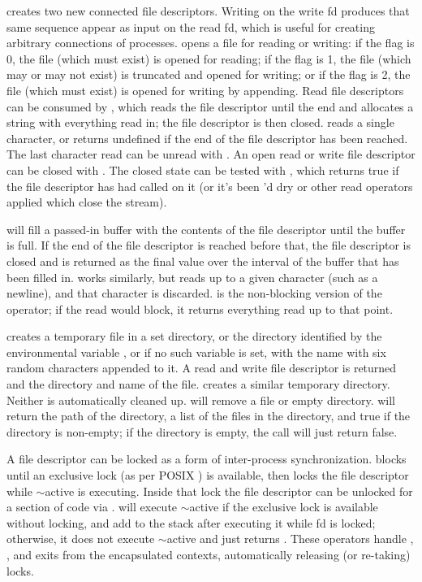  creates two new connected file descriptors. Writing on the
write fd produces that same sequence appear as input on the read fd,
which is useful for creating arbitrary connections of
processes.  opens a file for reading or writing: if the
flag is 0, the file (which must exist) is opened for reading; if the
flag is 1, the file (which may or may not exist) is truncated and
opened for writing; or if the flag is 2, the file (which must exist)
is opened for writing by appending. Read file descriptors can be
consumed by , which reads the file descriptor until the end
and allocates a string with everything read in; the file descriptor is
then closed.  reads a single character, or returns undefined
if the end of the file descriptor has been reached. The last character
read can be unread with . An open read or write file
descriptor can be closed with . The closed state can be
tested with , which returns true if the file descriptor
has had  called on it (or it's been 'd dry or
other read operators applied which close the stream).

 will fill a passed-in buffer with the contents of the file
descriptor until the buffer is full. If the end of the file descriptor
is reached before that, the file descriptor is closed and
 is returned as the final value over the interval of the
buffer that has been filled in.  works similarly, but
reads up to a given character (such as a newline), and that character
is discarded.  is the non-blocking version of the
operator; if the read would block, it returns everything read up to
that point.

 creates a temporary file in a set directory, or the
directory identified by the environmental variable ,
or  if no such variable is set, with the name 
with six random characters appended to it. A read and write file
descriptor is returned and the directory and name of the
file.  creates a similar temporary directory. Neither is
automatically cleaned up.  will remove a file or empty
directory.  will return the path of the directory, a list
of the files in the directory, and true if the directory is non-empty;
if the directory is empty, the call will just return false.

A file descriptor can be locked as a form of inter-process
synchronization.  blocks until an exclusive lock (as per
POSIX ) is available, then locks the file descriptor
while $\sim$active is executing. Inside that lock the file descriptor
can be unlocked for a section of code via
.  will execute $\sim$active if the
exclusive lock is available without locking, and add  to
the stack after executing it while fd is locked; otherwise, it does
not execute $\sim$active and just returns . These
operators handle , ,  and 
exits from the encapsulated contexts, automatically releasing (or
re-taking) locks.


